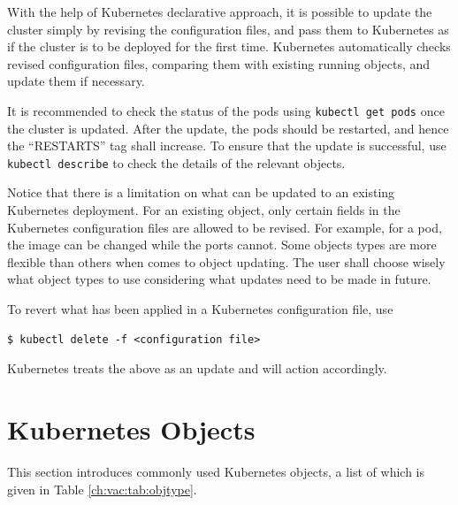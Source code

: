 With the help of Kubernetes declarative approach, it is possible to update the cluster simply by revising the configuration files, and pass them to Kubernetes as if the cluster is to be deployed for the first time. Kubernetes automatically checks revised configuration files, comparing them with existing running objects, and update them if necessary.

It is recommended to check the status of the pods using \verb|kubectl get pods| once the cluster is updated. After the update, the pods should be restarted, and hence the ``RESTARTS'' tag shall increase. To ensure that the update is successful, use \verb|kubectl describe| to check the details of the relevant objects.

Notice that there is a limitation on what can be updated to an existing Kubernetes deployment. For an existing object, only certain fields in the Kubernetes configuration files are allowed to be revised. For example, for a pod, the image can be changed while the ports cannot. Some objects types are more flexible than others when comes to object updating. The user shall choose wisely what object types to use considering what updates need to be made in future.

To revert what has been applied in a Kubernetes configuration file, use
\begin{lstlisting}
$ kubectl delete -f <configuration file>
\end{lstlisting}
Kubernetes treats the above as an update and will action accordingly.

\section{Kubernetes Objects} \label{ch:vac:sec:objects}

This section introduces commonly used Kubernetes objects, a list of which is given in Table \ref{ch:vac:tab:objtype}.

